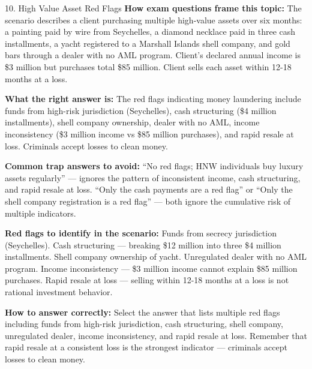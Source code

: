 \documentclass[11pt,a4paper]{beamer}
\begin{document}
	\begin{frame}{10. High Value Asset Red Flags}
		\tiny
		\noindent\textbf{How exam questions frame this topic:} The scenario describes a client purchasing multiple high-value assets over six months: a painting paid by wire from Seychelles, a diamond necklace paid in three cash installments, a yacht registered to a Marshall Islands shell company, and gold bars through a dealer with no AML program. Client's declared annual income is \$3 million but purchases total \$85 million. Client sells each asset within 12-18 months at a loss.
		
		\vspace{0.1cm}
		\noindent\textbf{What the right answer is:} The red flags indicating money laundering include funds from high-risk jurisdiction (Seychelles), cash structuring (\$4 million installments), shell company ownership, dealer with no AML, income inconsistency (\$3 million income vs \$85 million purchases), and rapid resale at loss. Criminals accept losses to clean money.
		
		\vspace{0.1cm}
		\noindent\textbf{Common trap answers to avoid:} “No red flags; HNW individuals buy luxury assets regularly” — ignores the pattern of inconsistent income, cash structuring, and rapid resale at loss. “Only the cash payments are a red flag” or “Only the shell company registration is a red flag” — both ignore the cumulative risk of multiple indicators.
		
		\vspace{0.1cm}
		\noindent\textbf{Red flags to identify in the scenario:} Funds from secrecy jurisdiction (Seychelles). Cash structuring — breaking \$12 million into three \$4 million installments. Shell company ownership of yacht. Unregulated dealer with no AML program. Income inconsistency — \$3 million income cannot explain \$85 million purchases. Rapid resale at loss — selling within 12-18 months at a loss is not rational investment behavior.
		
		\vspace{0.1cm}
		\noindent\textbf{How to answer correctly:} Select the answer that lists multiple red flags including funds from high-risk jurisdiction, cash structuring, shell company, unregulated dealer, income inconsistency, and rapid resale at loss. Remember that rapid resale at a consistent loss is the strongest indicator — criminals accept losses to clean money.
	\end{frame}
	
\end{document}
